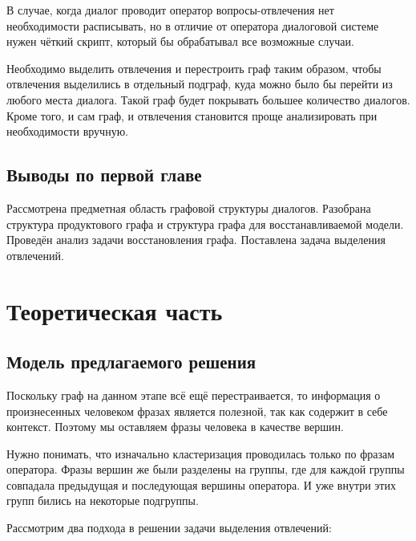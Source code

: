 \documentclass[specification,annotation]{itmo-student-thesis}
\begin{document}
	В случае, когда диалог проводит оператор вопросы-отвлечения нет необходимости расписывать, но в отличие от оператора диалоговой системе нужен чёткий скрипт, который бы обрабатывал все возможные случаи.
	
	Необходимо выделить отвлечения и перестроить граф таким образом, чтобы отвлечения выделились в отдельный подграф, куда можно было бы перейти из любого места диалога. Такой граф будет покрывать большее количество диалогов. Кроме того, и сам граф, и отвлечения становится проще анализировать при необходимости вручную.
	
	\section{Выводы по первой главе}
	Рассмотрена предметная область графовой структуры диалогов. Разобрана структура продуктового графа и структура графа для восстанавливаемой модели. Проведён анализ задачи восстановления графа. Поставлена задача выделения отвлечений. 
	
	\chapter{Теоретическая часть}
	\section{Модель предлагаемого решения}
	Поскольку граф на данном этапе всё ещё перестраивается, то информация о произнесенных человеком фразах является полезной, так как содержит в себе контекст. Поэтому мы оставляем фразы человека в качестве вершин.
	
	Нужно понимать, что изначально кластеризация проводилась только по фразам оператора. Фразы вершин же были разделены на группы, где для каждой группы совпадала предыдущая и последующая вершины оператора. И уже внутри этих групп бились на некоторые подгруппы.
	
	Рассмотрим два подхода в решении задачи выделения отвлечений:
	
\end{document}

